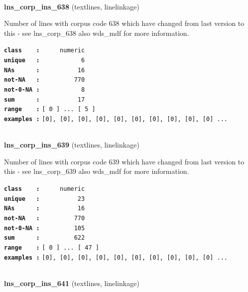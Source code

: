 \documentclass[]{article}
\begin{document}
~

\textbf{lns\_corp\_ins\_638} (textlines, linelinkage)

Number of lines with corpus code 638 which have changed from last
version to this - see lns\_corp\_638 also wds\_mdf for more information.

\textbf{\texttt{class\ \ \ \ :}} \texttt{~~~~~numeric}\\
\textbf{\texttt{unique\ \ \ :}} \texttt{~~~~~~~~~~~6}\\
\textbf{\texttt{NAs\ \ \ \ \ \ :}} \texttt{~~~~~~~~~~16}\\
\textbf{\texttt{not-NA\ \ \ :}} \texttt{~~~~~~~~~770}\\
\textbf{\texttt{not-0-NA\ :}} \texttt{~~~~~~~~~~~8}\\
\textbf{\texttt{sum\ \ \ \ \ \ :}} \texttt{~~~~~~~~~~17}\\
\textbf{\texttt{range\ \ \ \ :}}
\texttt{{[}\ 0\ {]}\ ...\ {[}\ 5\ {]}}\\
\textbf{\texttt{examples\ :}}
\texttt{{[}0{]},\ {[}0{]},\ {[}0{]},\ {[}0{]},\ {[}0{]},\ {[}0{]},\ {[}0{]},\ {[}0{]},\ {[}0{]},\ {[}0{]}\ ...}\\

~

\textbf{lns\_corp\_ins\_639} (textlines, linelinkage)

Number of lines with corpus code 639 which have changed from last
version to this - see lns\_corp\_639 also wds\_mdf for more information.

\textbf{\texttt{class\ \ \ \ :}} \texttt{~~~~~numeric}\\
\textbf{\texttt{unique\ \ \ :}} \texttt{~~~~~~~~~~23}\\
\textbf{\texttt{NAs\ \ \ \ \ \ :}} \texttt{~~~~~~~~~~16}\\
\textbf{\texttt{not-NA\ \ \ :}} \texttt{~~~~~~~~~770}\\
\textbf{\texttt{not-0-NA\ :}} \texttt{~~~~~~~~~105}\\
\textbf{\texttt{sum\ \ \ \ \ \ :}} \texttt{~~~~~~~~~622}\\
\textbf{\texttt{range\ \ \ \ :}}
\texttt{{[}\ 0\ {]}\ ...\ {[}\ 47\ {]}}\\
\textbf{\texttt{examples\ :}}
\texttt{{[}0{]},\ {[}0{]},\ {[}0{]},\ {[}0{]},\ {[}0{]},\ {[}0{]},\ {[}0{]},\ {[}0{]},\ {[}0{]},\ {[}0{]}\ ...}\\

~

\textbf{lns\_corp\_ins\_641} (textlines, linelinkage)
\end{document}

